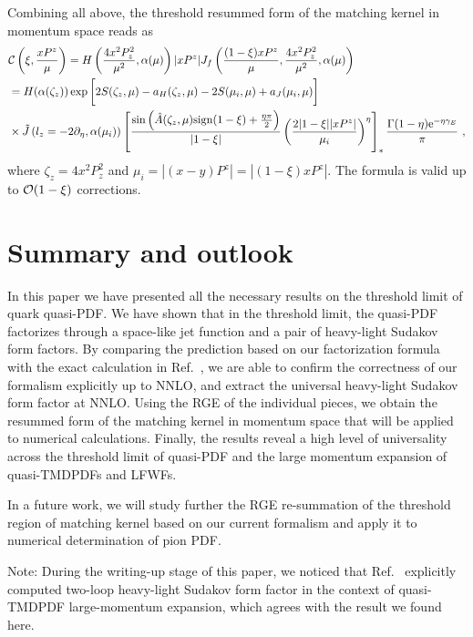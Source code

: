 \documentclass[a4paper,11pt]{article}
\begin{document}
Combining all above, the threshold resummed form of the matching kernel in momentum space reads as
\begin{align}
&{\cal C}\left(\xi,\frac{xP^z}{\mu}\right)=H\left(\frac{4x^2P_z^2}{\mu^2},\alpha(\mu)\right) |xP^z| J_f\left(\frac{(1-\xi)xP^z}{\mu},\frac{4x^2P_z^2}{\mu^2},\alpha(\mu)\right) \nonumber \\ 
&=H(\alpha(\zeta_z))\exp \bigg[2S(\zeta_z,\mu)-a_{H}(\zeta_z,\mu)-2S(\mu_i,\mu)+a_{J}(\mu_i,\mu)\bigg] \nonumber \\
&\times \tilde J\left(l_z=-2 \partial_\eta,\alpha(\mu_i)\right) \left[\frac{\sin \left(\hat A(\zeta_z,\mu){\rm sign}(1-\xi)+\frac{\eta \pi}{2}\right)}{|1-\xi|}\left(\frac{2|1-\xi||xP^z|}{\mu_i}\right)^\eta\right]_{*}\frac{ \Gamma(1-\eta) \mathrm{e}^{-\eta \gamma_E}}{\pi} \ ,
\end{align}
where $\zeta_z=4x^2P_z^2$ and $\mu_i=|(x-y)P^z|=|(1-\xi)xP^z|$. The formula is valid up to ${\cal O}(1-\xi)$ corrections. 


\section{Summary and outlook}\label{sec:conc}
In this paper we have presented all the necessary results on the threshold limit of quark quasi-PDF. We have shown that in the threshold limit, the quasi-PDF factorizes through a space-like jet function and a pair of heavy-light Sudakov form factors. By comparing the prediction based on our factorization formula with the exact calculation in Ref.~\cite{Li:2020xml,Chen:2020ody}, we are able to confirm the correctness of our formalism explicitly up to NNLO, and extract the universal heavy-light Sudakov form factor at NNLO.
Using the RGE of the individual pieces, we obtain the resummed form of the matching kernel in momentum space that will be applied to numerical calculations. Finally, the results reveal a high level of universality across the threshold limit of quasi-PDF and the large momentum expansion of quasi-TMDPDFs and LFWFs.

In a future work, we will study further the RGE re-summation of the threshold region of matching kernel based on our current formalism and apply it to numerical determination of pion PDF. 

Note: During the writing-up stage of this paper, we noticed that Ref.~\cite{delRio:2023pse} explicitly computed two-loop heavy-light Sudakov form factor 
in the context of quasi-TMDPDF large-momentum expansion, which 
agrees with the result we found here. 
\end{document}
